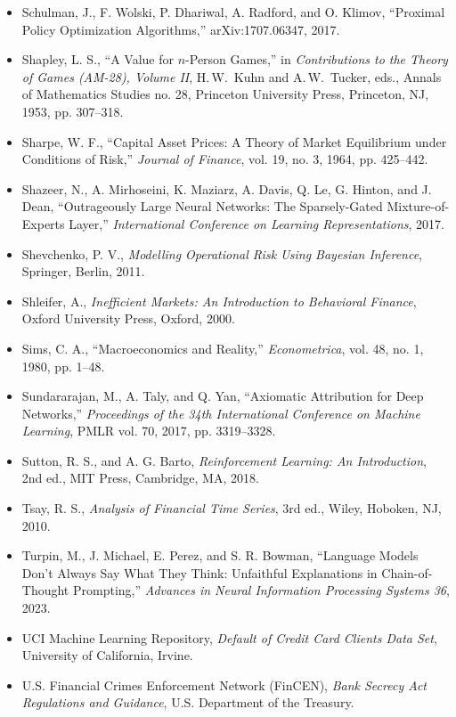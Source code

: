 \documentclass{book}
\begin{document}
\begin{itemize}
    \item Schulman, J., F. Wolski, P. Dhariwal, A. Radford, and O. Klimov, ``Proximal Policy Optimization Algorithms,'' arXiv:1707.06347, 2017.
    \item Shapley, L. S., ``A Value for $n$-Person Games,'' in \emph{Contributions to the Theory of Games (AM-28), Volume II}, H.\,W.\ Kuhn and A.\,W.\ Tucker, eds., Annals of Mathematics Studies no. 28, Princeton University Press, Princeton, NJ, 1953, pp. 307--318.
    \item Sharpe, W. F., ``Capital Asset Prices: A Theory of Market Equilibrium under Conditions of Risk,'' \emph{Journal of Finance}, vol. 19, no. 3, 1964, pp. 425--442.
    \item Shazeer, N., A. Mirhoseini, K. Maziarz, A. Davis, Q. Le, G. Hinton, and J. Dean, ``Outrageously Large Neural Networks: The Sparsely-Gated Mixture-of-Experts Layer,'' \emph{International Conference on Learning Representations}, 2017.
    \item Shevchenko, P. V., \emph{Modelling Operational Risk Using Bayesian Inference}, Springer, Berlin, 2011.
    \item Shleifer, A., \emph{Inefficient Markets: An Introduction to Behavioral Finance}, Oxford University Press, Oxford, 2000.
    \item Sims, C. A., ``Macroeconomics and Reality,'' \emph{Econometrica}, vol. 48, no. 1, 1980, pp. 1--48.
    \item Sundararajan, M., A. Taly, and Q. Yan, ``Axiomatic Attribution for Deep Networks,'' \emph{Proceedings of the 34th International Conference on Machine Learning}, PMLR vol. 70, 2017, pp. 3319--3328.
    \item Sutton, R. S., and A. G. Barto, \emph{Reinforcement Learning: An Introduction}, 2nd ed., MIT Press, Cambridge, MA, 2018.
    \item Tsay, R. S., \emph{Analysis of Financial Time Series}, 3rd ed., Wiley, Hoboken, NJ, 2010.
    \item Turpin, M., J. Michael, E. Perez, and S. R. Bowman, ``Language Models Don't Always Say What They Think: Unfaithful Explanations in Chain-of-Thought Prompting,'' \emph{Advances in Neural Information Processing Systems 36}, 2023.
    \item UCI Machine Learning Repository, \emph{Default of Credit Card Clients Data Set}, University of California, Irvine.
    \item U.S. Financial Crimes Enforcement Network (FinCEN), \emph{Bank Secrecy Act Regulations and Guidance}, U.S. Department of the Treasury.

\end{itemize}
\end{document}
